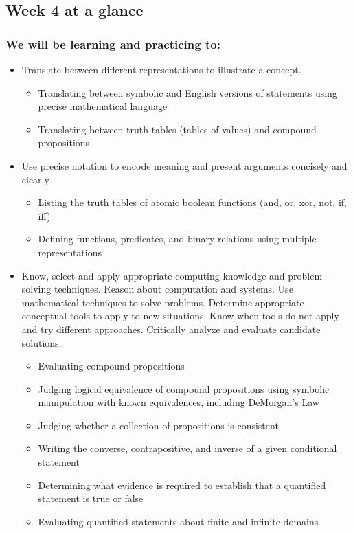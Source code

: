 

\subsection*{Week 4 at a glance}

\subsubsection*{We will be learning and practicing to:}
\begin{itemize}

\item Translate between different representations to illustrate a concept.
\begin{itemize}
   \item Translating between symbolic and English versions of statements using precise mathematical language
   \item Translating between truth tables (tables of values) and compound propositions
\end{itemize}

\item Use precise notation to encode meaning and present arguments concisely and clearly
\begin{itemize}
    \item Listing the truth tables of atomic boolean functions (and, or, xor, not, if, iff)
    \item Defining functions, predicates, and binary relations using multiple representations
\end{itemize}

\item Know, select and apply appropriate computing knowledge and problem-solving techniques. Reason about computation and systems. Use mathematical techniques to solve problems. Determine appropriate conceptual tools to apply to new situations. Know when tools do not apply and try different approaches. Critically analyze and evaluate candidate solutions.
\begin{itemize}
    \item Evaluating compound propositions
    \item Judging logical equivalence of compound propositions using symbolic manipulation with known equivalences, including DeMorgan's Law
    \item Judging whether a collection of propositions is consistent
    \item Writing the converse, contrapositive, and inverse of a given conditional statement
    \item Determining what evidence is required to establish that a quantified statement is true or false
    \item Evaluating quantified statements about finite and infinite domains
\end{itemize}

\end{itemize}

